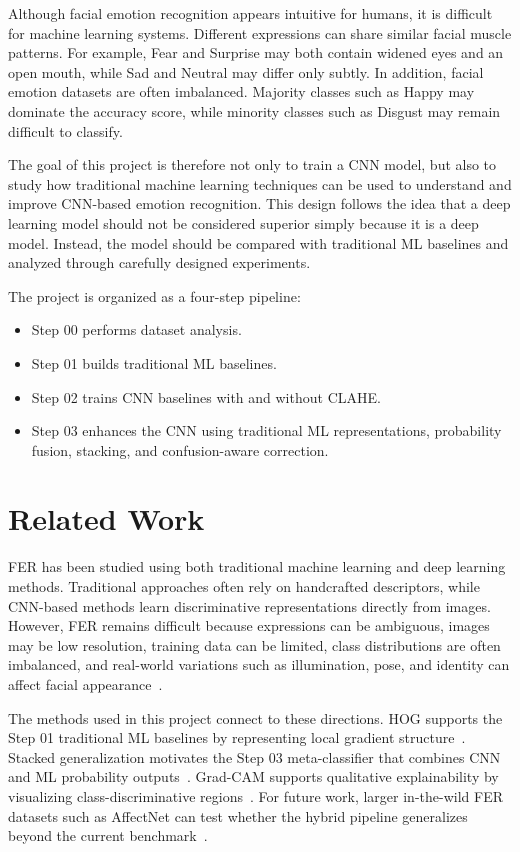 \documentclass[conference]{IEEEtran}
\begin{document}
Although facial emotion recognition appears intuitive for humans, it is
difficult for machine learning systems. Different expressions can share similar
facial muscle patterns. For example, Fear and Surprise may both contain widened
eyes and an open mouth, while Sad and Neutral may differ only subtly. In
addition, facial emotion datasets are often imbalanced. Majority classes such
as Happy may dominate the accuracy score, while minority classes such as
Disgust may remain difficult to classify.

The goal of this project is therefore not only to train a CNN model, but also
to study how traditional machine learning techniques can be used to understand
and improve CNN-based emotion recognition. This design follows the idea that a
deep learning model should not be considered superior simply because it is a
deep model. Instead, the model should be compared with traditional ML baselines
and analyzed through carefully designed experiments.

The project is organized as a four-step pipeline:
\begin{itemize}
    \item Step 00 performs dataset analysis.
    \item Step 01 builds traditional ML baselines.
    \item Step 02 trains CNN baselines with and without CLAHE.
    \item Step 03 enhances the CNN using traditional ML representations,
    probability fusion, stacking, and confusion-aware correction.
\end{itemize}

\section{Related Work}

FER has been studied using both traditional machine learning and deep learning
methods. Traditional approaches often rely on handcrafted descriptors, while
CNN-based methods learn discriminative representations directly from images.
However, FER remains difficult because expressions can be ambiguous, images may
be low resolution, training data can be limited, class distributions are often
imbalanced, and real-world variations such as illumination, pose, and identity
can affect facial appearance~\cite{li2020deepfer}.

The methods used in this project connect to these directions. HOG supports the
Step 01 traditional ML baselines by representing local gradient
structure~\cite{dalal2005hog}. Stacked generalization motivates the Step 03
meta-classifier that combines CNN and ML probability outputs~\cite{wolpert1992stacked}.
Grad-CAM supports qualitative explainability by visualizing
class-discriminative regions~\cite{selvaraju2017gradcam}. For future work,
larger in-the-wild FER datasets such as AffectNet can test whether the hybrid
pipeline generalizes beyond the current benchmark~\cite{mollahosseini2019affectnet}.
\end{document}
